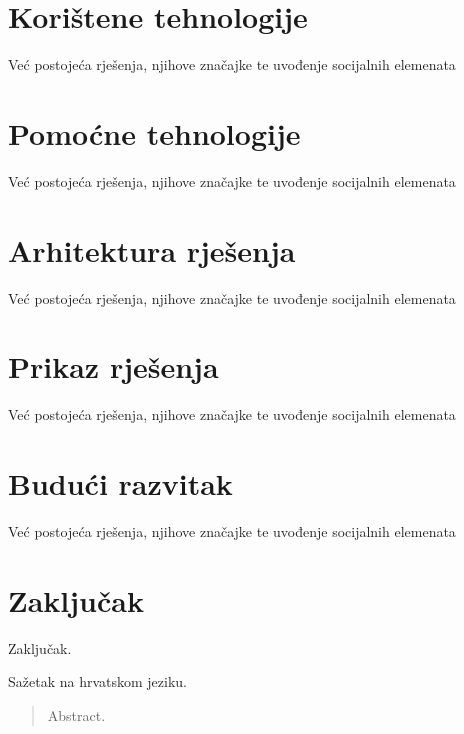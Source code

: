 \documentclass[times, utf8, zavrsni]{fer}
\begin{document}
\chapter{Korištene tehnologije}
Već postojeća rješenja, njihove značajke te uvođenje socijalnih elemenata

\chapter{Pomoćne tehnologije}
Već postojeća rješenja, njihove značajke te uvođenje socijalnih elemenata

\chapter{Arhitektura rješenja}
Već postojeća rješenja, njihove značajke te uvođenje socijalnih elemenata

\chapter{Prikaz rješenja}
Već postojeća rješenja, njihove značajke te uvođenje socijalnih elemenata

\chapter{Budući razvitak}
Već postojeća rješenja, njihove značajke te uvođenje socijalnih elemenata

\chapter{Zaključak}
Zaključak.




\begin{sazetak}
Sažetak na hrvatskom jeziku.

\end{sazetak}

\begin{abstract}
Abstract.

\end{abstract}
\end{document}
